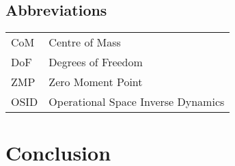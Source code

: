\documentclass{thesisreport}
\begin{document}
\newpage

\section*{Abbreviations}

\begin{tabular}{p{3cm}p{10cm}}
CoM & Centre of Mass \\
DoF & Degrees of Freedom \\
ZMP & Zero Moment Point \\
OSID & Operational Space Inverse Dynamics \\


\end{tabular}

 \newpage
 
 \tableofcontents

 \listoffigures
 
\listoftables
 

 
 
 
  
  
 
 
 \chapter*{Conclusion}
 
 
 
 
 
 \appendix	
 
 
 
 
 
 
 
 
\end{document}
